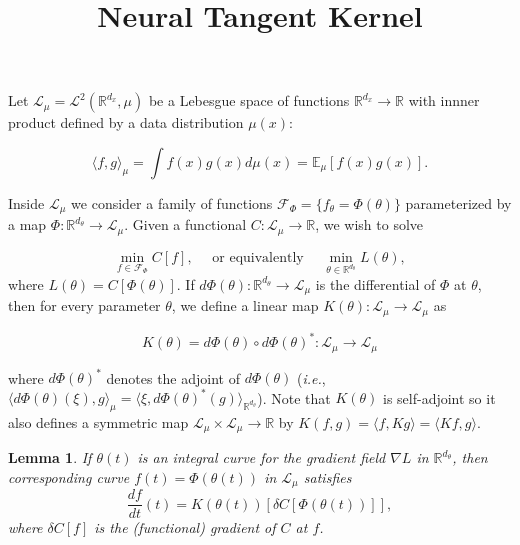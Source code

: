 \documentclass{article}
\title{{\bf Neural Tangent Kernel}}
\author{}
\date{}
\newtheorem{lemma}[theorem]{Lemma}
\newcommand{\RR}{\mathbb{R}}
\newcommand{\ie}{{\em i.e.}}
\begin{document}
\maketitle

Let $\mathcal L_\mu = \mathcal L^2(\RR^{d_x},\mu)$ be a
Lebesgue space of functions $\RR^ {d_x} \rightarrow \RR$ with innner product
defined by a data distribution $\mu (x)$:

\begin{equation}
\langle f, g \rangle_{\mu} = \int f(x)g(x) d\mu(x) = \mathbb E_\mu
[f
(x)g
(x)].
\end{equation}

Inside $\mathcal L_\mu$ we consider a family of functions $\mathcal F_\Phi =
\{f_\theta = \Phi (\theta)\}$ parameterized by a map $\Phi: \RR^ {d_\theta}
\rightarrow \mathcal L_\mu$. Given a functional $C: \mathcal L_\mu \rightarrow \RR$, we wish to solve

\begin{equation}
\min_{f \in \mathcal F_\Phi} C[f], \quad \mbox{ or equivalently } \quad \min_
{\theta \in
\RR^{d_\theta}} L(\theta),
\end{equation} where $L(\theta) = C[\Phi(\theta)]$. If $d \Phi(\theta): \RR^{d_\theta}
\rightarrow \mathcal L_\mu$ is the differential of $\Phi$ at $\theta$, then for
every parameter $\theta$, we define a linear map $K(\theta): \mathcal L_\mu
\rightarrow \mathcal L_\mu$ as

\begin{equation}
K(\theta) = d \Phi(\theta) \circ d \Phi(\theta)^*: \mathcal L_\mu \rightarrow \mathcal L_\mu
\end{equation}

where $d \Phi(\theta)^*$ denotes the adjoint of $d \Phi(\theta)$ (\ie,
$\langle d \Phi(\theta)(\xi), g \rangle_{\mu} = \langle \xi, d \Phi
(\theta)^*(g) \rangle_{\RR^{d_\theta}}$). Note that $K(\theta)$ is
self-adjoint so it also defines a symmetric map $\mathcal L_\mu \times \mathcal L_\mu
\rightarrow \RR$ by $K(f,g) = \langle f, K g \rangle = \langle K f, g
\rangle$.

\begin{lemma} If $\theta(t)$ is an integral curve for the gradient field $\nabla L$ in $\RR^{d_\theta}$,
then corresponding curve $f(t) = \Phi(\theta(t))$ in $\mathcal L_\mu$ satisfies
\begin{equation}
\frac{d f}{dt}(t) = K(\theta(t))[\delta C[\Phi(\theta(t))]],
\end{equation}
where $\delta C[f]$ is the (functional) gradient of $C$ at $f$.
\end{lemma}
\end{document}
